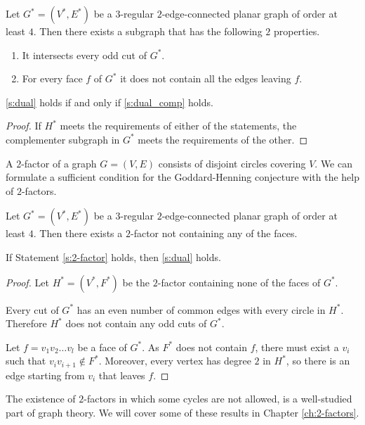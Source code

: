 \begin{guess}\label{s:dual_comp}
  Let $G^* = (V^*, E^*)$ be a $3$-regular $2$-edge-connected planar graph of order at least $4$.
  Then there exists a subgraph that has the following $2$ properties.
  \begin{enumerate}
    \item It intersects every odd cut of $G^*$.
    \item For every face $f$ of $G^*$ it does not contain all the edges leaving $f$.
  \end{enumerate}
\end{guess}

\begin{claim}
  \ref{s:dual} holds if and only if \ref{s:dual_comp} holds.
\end{claim}
\begin{proof}
  If $H^*$ meets the requirements of either of the statements, the complementer subgraph in $G^*$
  meets the requirements of the other.
\end{proof}

A $2$-factor of a graph $G = (V, E)$ consists of disjoint circles covering $V$.
We can formulate a sufficient condition for the Goddard-Henning conjecture with
the help of $2$-factors.

\begin{guess} \label{s:2-factor}
  Let $G^* = (V^*, E^*)$ be a $3$-regular $2$-edge-connected planar graph of order at least $4$.
  Then there exists a $2$-factor not containing any of the faces.
\end{guess}
\begin{claim} \label{c:2-factor}
  If Statement \ref{s:2-factor} holds, then \ref{s:dual} holds.
\end{claim}
\begin{proof}
  Let $H^* = (V^*, F^*)$ be the $2$-factor containing none of the faces of $G^*$.

  Every cut of $G^*$ has an even number of common edges with every circle in $H^*$.
  Therefore $H^*$ does not contain any odd cuts of $G^*$.

  Let $f = v_1v_2 \dots v_l$ be a face of $G^*$. As $F^*$ does not contain $f$,
  there must exist a $v_i$ such that $v_iv_{i + 1} \notin F^*$. Moreover, every
  vertex has degree $2$ in $H^*$, so there is an edge starting from $v_i$ that leaves $f$.
\end{proof}

The existence of $2$-factors in which some cycles are not allowed, is a well-studied
part of graph theory. We will cover some of these results in Chapter \ref{ch:2-factors}.

